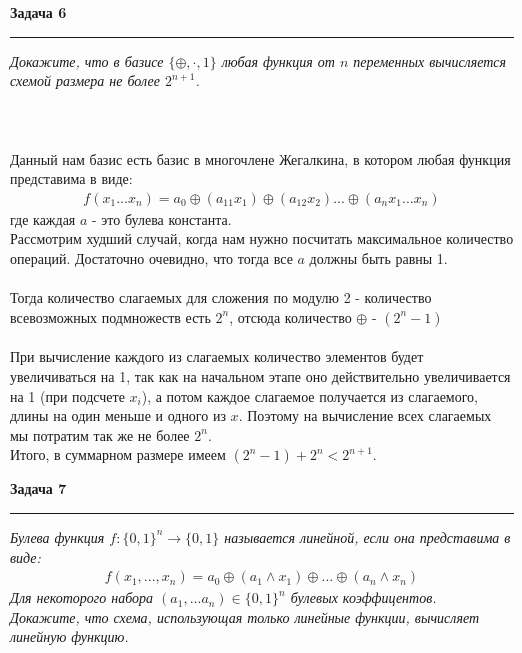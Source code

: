 \documentclass[11pt,a4paper]{scrartcl}
\begin{document}
\textbf{\Large Задача 6}
\medskip\hrule\medskip
\textsl{Докажите, что в базисе $ \{ \oplus, \cdot, 1 \} $ любая функция от $ n $ переменных вычисляется схемой размера не более $ 2^{n + 1} $.} \\ \\
 \\ \\
Данный нам базис есть базис в многочлене Жегалкина, в котором любая функция представима в виде:
\begin{gather*}
	f(x_1 ... x_n) = a_0 \oplus (a_{11} x_1) \oplus (a_{12} x_2) ... \oplus (a_n x_1 ... x_n)
\end{gather*} 
где каждая $ a $ - это булева константа. \\
Рассмотрим худший случай, когда нам нужно посчитать максимальное количество операций. Достаточно очевидно, что тогда все $ a $  должны  быть равны 1. \\ \\
Тогда количество слагаемых для сложения по модулю 2 - количество всевозможных подмножеств есть $ 2^n $, отсюда количество $ \oplus $ - $ (2^n - 1) $ \\ \\
При вычисление каждого из слагаемых количество элементов будет увеличиваться на 1, так как на начальном этапе оно действительно увеличивается на  1 (при подсчете $ x_i $), а потом каждое слагаемое получается из слагаемого, длины на один меньше и одного из $ x $. Поэтому на вычисление всех слагаемых мы потратим так же не более $ 2^n $. \\
Итого, в суммарном размере имеем $ (2^n - 1) + 2^n < 2^{n + 1}$.
\newpage



















\textbf{\Large Задача 7}
\medskip\hrule\medskip
\textsl{Булева функция $ f: \{0, 1\}^n \rightarrow \{0, 1\}$ называется линейной, если она представима в виде:} 
\begin{align*}
	f(x_1, ..., x_n) = a_0 \oplus (a_1 \land x_1) \oplus ... \oplus (a_n \land x_n)
\end{align*}
\textsl{Для некоторого набора $ (a_1, ... a_n) \in \{0, 1\}^n$ булевых коэффицентов.} \\
\textsl{Докажите, что схема, использующая только линейные функции, вычисляет линейную функцию.} \\ \\ 
\end{document}
